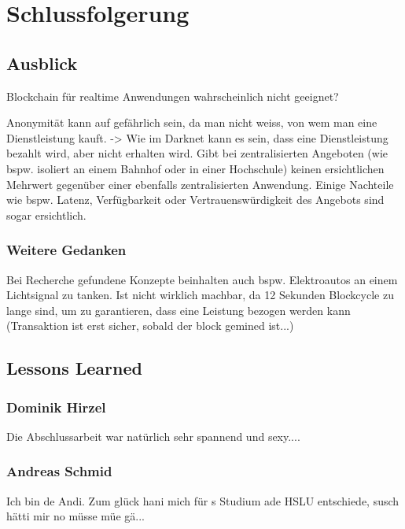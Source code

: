 \chapter{Schlussfolgerung}
\label{cha:Schlussfolgerung}

\section{Ausblick}
\label{sec:Ausblick}
Blockchain für realtime Anwendungen wahrscheinlich nicht geeignet?
\par
Anonymität kann auf gefährlich sein, da man nicht weiss, von wem man eine Dienstleistung kauft. -> Wie im Darknet kann es sein, dass eine Dienstleistung bezahlt wird, aber nicht erhalten wird.
Gibt bei zentralisierten Angeboten (wie bspw. isoliert an einem Bahnhof oder in einer Hochschule) keinen ersichtlichen Mehrwert gegenüber einer ebenfalls zentralisierten Anwendung. Einige Nachteile wie bspw. Latenz, Verfügbarkeit oder Vertrauenswürdigkeit des Angebots sind sogar ersichtlich.

\subsection{Weitere Gedanken}
Bei Recherche gefundene Konzepte beinhalten auch bspw. Elektroautos an einem Lichtsignal zu tanken. Ist nicht wirklich machbar, da 12 Sekunden Blockcycle zu lange sind, um zu garantieren, dass eine Leistung bezogen werden kann (Transaktion ist erst sicher, sobald der block gemined ist...)



\section{Lessons Learned}
\label{sec:Lessons_Learned}

\subsection{Dominik Hirzel}
Die Abschlussarbeit war natürlich sehr spannend und sexy....

\subsection{Andreas Schmid}
Ich bin de Andi. Zum glück hani mich für s Studium ade HSLU entschiede, susch hätti mir no müsse müe gä...
